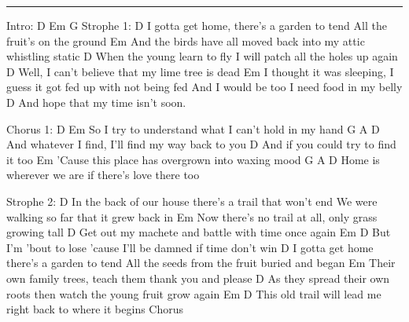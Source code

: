 \noindent\rule{\columnwidth}{1pt}


\begin{lstsong}
Intro: D Em G
Strophe 1:
D
I gotta get home, there's a garden to tend
All the fruit's on the ground
                                  Em
And the birds have all moved back into my attic whistling static
                                                          D
When the young learn to fly I will patch all the holes up again
D
Well, I can't believe that my lime tree is dead
                                                      Em
I thought it was sleeping, I guess it got fed up with not being fed
And I would be too I need food in my belly
                            D
And hope that my time isn't soon.

Chorus 1:
D                             Em
So I try to understand what I can't hold in my hand
    G                A                        D
And whatever I find, I'll find my way back to you
D
And if you could try to find it too
            Em
'Cause this place has overgrown into waxing mood
G                                  A          D
Home is wherever we are if there's love there too

Strophe 2:
D
In the back of our house there's a trail that won't end
We were walking so far that it grew back in
            Em
Now there's no trail at all, only grass growing tall
                                              D
Get out my machete and battle with time once again
Em                                                        D
But I'm 'bout to lose 'cause I'll be damned if time don't win
D
I gotta get home there's a garden to tend
All the seeds from the fruit buried and began
      Em
Their own family trees, teach them thank you and please
                                                                D
As they spread their own roots then watch the young fruit grow again
Em                                                   D
This old trail will lead me right back to where it begins
Chorus
\end{lstsong}
\newpage


